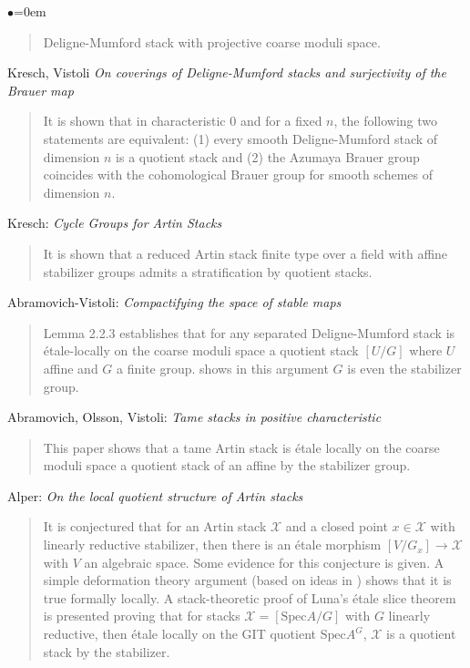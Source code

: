 \begin{list}{$\bullet$}{\leftmargin=0em}
\begin{quote}
Deligne-Mumford stack with projective coarse moduli space.
\end{quote}
\smallskip
\item
Kresch, Vistoli \emph{On coverings of Deligne-Mumford stacks and surjectivity 
of the Brauer map} \cite{kresch-vistoli}
\begin{quote}
It is shown that in characteristic 0 and for a fixed $n$, the following two 
statements are equivalent: (1) every smooth Deligne-Mumford stack of dimension 
$n$ is a quotient stack and (2) the Azumaya Brauer group coincides with the 
cohomological Brauer group for smooth schemes of dimension $n$.
\end{quote}
\smallskip
\item
Kresch: \emph{Cycle Groups for Artin Stacks} \cite{kresch_cycle}
\begin{quote}
It is shown that a reduced Artin stack finite type over a field with affine 
stabilizer groups admits a stratification by quotient stacks.
\end{quote}
\smallskip
\item Abramovich-Vistoli:
\emph{Compactifying the space of stable maps} \cite{abramovich-vistoli}
\begin{quote}
Lemma 2.2.3 establishes that for any separated Deligne-Mumford stack is 
\'etale-locally on the coarse moduli space a quotient stack $[U/G]$ where $U$ 
affine and $G$ a finite group. \cite[Theorem 2.12]{olsson_homstacks} shows in 
this argument $G$ is even the stabilizer group.
\end{quote}
\smallskip
\item Abramovich, Olsson, Vistoli:
\emph{Tame stacks in positive characteristic} \cite{tame}
\begin{quote}
This paper shows that a tame Artin stack is \'etale locally on the coarse 
moduli space a quotient stack of an affine by the stabilizer group.
\end{quote}
\smallskip
\item Alper: \emph{On the local quotient structure of Artin stacks} 
\cite{alper_quotient}
\begin{quote}
It is conjectured that for an Artin stack $\mathcal{X}$ and a closed point $x 
\in \mathcal{X}$ 
with linearly reductive stabilizer, then there is an \'etale morphism $[V/G_x] 
\to \mathcal{X}$ with $V$ an algebraic space. Some evidence for this 
conjecture is 
given. A simple deformation theory argument (based on ideas in \cite{tame}) 
shows that it is true formally locally. A stack-theoretic proof of Luna's 
\'etale slice theorem is presented proving that for stacks 
$\mathcal{X}=[\text{Spec} A / G]$ 
with $G$ linearly reductive, then \'etale locally on the GIT quotient 
$\text{Spec} 
A^G$, $\mathcal{X}$ is a quotient stack by the stabilizer. 
\end{quote}
\end{list}


